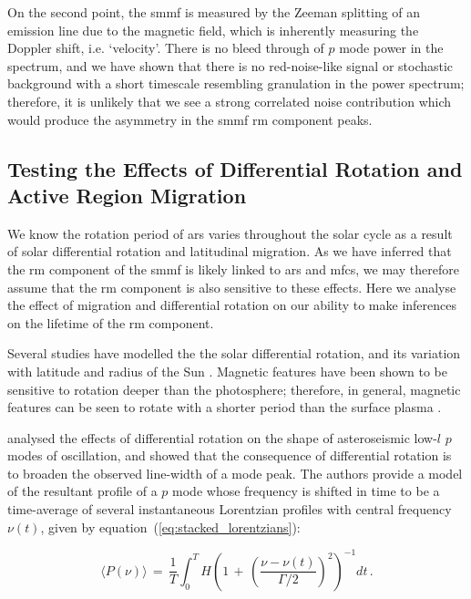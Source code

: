 On the second point, the \gls{smmf} is measured by the Zeeman splitting of an emission line due to the magnetic field, which is inherently measuring the Doppler shift, i.e. `velocity'. There is no bleed through of $p$ mode power in the spectrum, and we have shown that there is no red-noise-like signal or stochastic background with a short timescale resembling granulation in the power spectrum; therefore, it is unlikely that we see a strong correlated noise contribution which would produce the asymmetry in the \gls{smmf} \gls{rm} component peaks.

 
\subsection{Testing the Effects of Differential Rotation and Active Region Migration}
\label{sec:smearing}

We know the rotation period of \glspl{ar} varies throughout the solar cycle as a result of solar differential rotation and latitudinal migration. As we have inferred that the \gls{rm} component of the \gls{smmf} is likely linked to \glspl{ar} and \glspl{mfc}, we may therefore assume that the \gls{rm} component is also sensitive to these effects. Here we analyse the effect of migration and differential rotation on our ability to make inferences on the lifetime of the \gls{rm} component.

Several studies have modelled the the solar differential rotation, and its variation with latitude and radius of the Sun \citep[see][for an in depth review of the literature on solar differential rotation]{beck_comparison_2000, howe_solar_2009}. Magnetic features have been shown to be sensitive to rotation deeper than the photosphere; therefore, in general, magnetic features can be seen to rotate with a shorter period than the surface plasma \citep{howe_solar_2009}.

\citet{chaplin_distortion_2008} analysed the effects of differential rotation on the shape of asteroseismic low-$l$ $p$ modes of oscillation, and showed that the consequence of differential rotation is to broaden the observed line-width of a mode peak. The authors provide a model of the resultant profile of a $p$ mode whose frequency is shifted in time to be a time-average of several instantaneous Lorentzian profiles with central frequency $\nu(t)$, given by equation~(\ref{eq:stacked_lorentzians}):

\begin{equation}
\langle P(\nu) \rangle \, = \, \frac{1}{T} \int^T_0 H \left( 1 \, + \, \left( \frac{\nu - \nu(t)}{\Gamma /2} \right)^2 \right)^{-1} dt \, .
\label{eq:stacked_lorentzians}
\end{equation}

